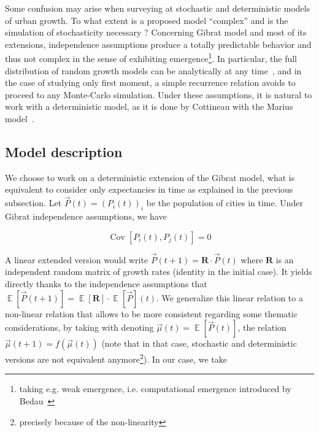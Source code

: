 \documentclass[Royal,sageh,times]{sagej}
\DeclareMathOperator{\Cov}{Cov}
\DeclareMathOperator{\E}{\mathbb{E}}
\newcommand{\Covb}[2]{\ensuremath{\Cov\!\left[#1,#2\right]}}
\newcommand{\Eb}[1]{\ensuremath{\E\!\left[#1\right]}}
\begin{document}

Some confusion may arise when surveying at stochastic and deterministic models of urban growth. To what extent is a proposed model ``complex'' and is the simulation of stochasticity necessary ? Concerning Gibrat model and most of its extensions, independence assumptions produce a totally predictable behavior and thus not complex in the sense of exhibiting emergence\footnote{taking e.g. weak emergence, i.e. computational emergence introduced by Bedau~\cite{}}. In particular, the full distribution of random growth models can be analytically at any time~\cite{}, and in the case of studying only first moment, a simple recurrence relation avoids to proceed to any Monte-Carlo simulation. Under these assumptions, it is natural to work with a deterministic model, as it is done by Cottineau with the Marius model~\cite{}.





\subsection{Model description}

We choose to work on a deterministic extension of the Gibrat model, what is equivalent to consider only expectancies in time as explained in the previous subsection. Let $\vec{P}(t)=(P_i(t))_i$ be the population of cities in time. Under Gibrat independence assumptions, we have

\[
\Covb{P_i(t)}{P_j(t)}=0
\]

A linear extended version would write $\vec{P}(t+1)=\mathbf{R}\cdot \vec{P}(t)$ where $\mathbf{R}$ is an independent random matrix of growth rates (identity in the initial case). It yields directly thanks to the independence assumptions that $\Eb{\vec{P}(t+1)}=\Eb{\mathbf{R}}\cdot\Eb{\vec{P}}(t)$. We generalize this linear relation to a non-linear relation that allows to be more consistent regarding some thematic considerations, by taking with denoting $\vec{\mu}(t)=\Eb{\vec{P}(t)}$, the relation $\vec{\mu}(t+1)=f(\vec{\mu}(t))$ (note that in that case, stochastic and deterministic versions are not equivalent anymore\footnote{precisely because of the non-linearity %
}). 
In our case, we take
\end{document}
